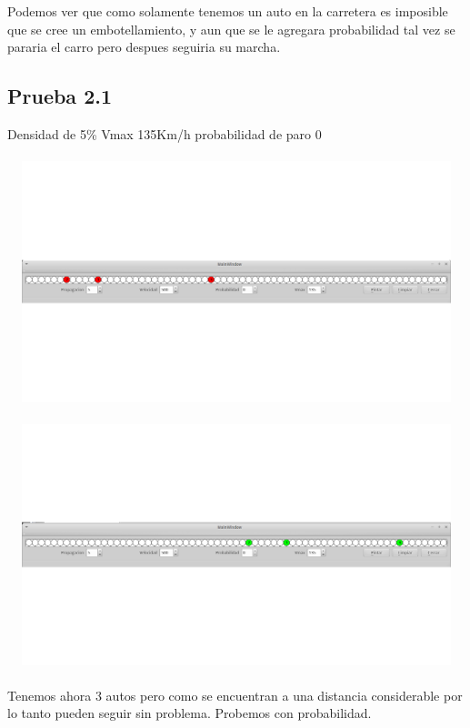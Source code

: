 \documentclass[a4paper,10pt]{article}
\begin{document}
\\ \\
Podemos ver que como solamente tenemos un auto en la carretera es imposible que se cree un embotellamiento, y aun que se le agregara 
probabilidad tal vez se pararia el carro pero despues seguiria su marcha.
\subsection{Prueba 2.1}
Densidad de 5\% Vmax 135Km/h probabilidad de paro 0%
\\ \\
\includegraphics[width=15cm, height=7cm]{7}
\\ \\
\includegraphics[width=15cm, height=7cm]{8}
\\ \\
Tenemos ahora 3 autos pero como se encuentran a una distancia considerable por lo tanto pueden seguir sin problema. Probemos con probabilidad.
\end{document}
